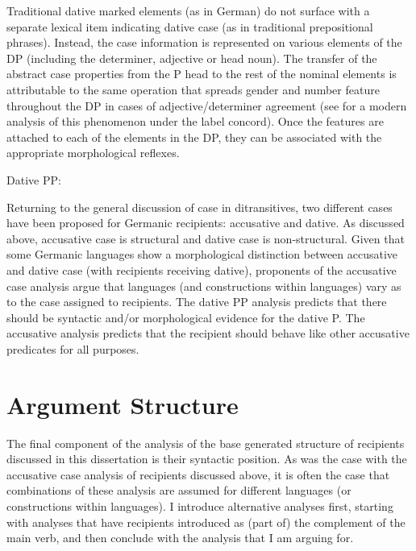 Traditional dative marked elements (as in German) do not surface with a separate lexical item indicating dative case (as in traditional prepositional phrases). Instead, the case information is represented on various elements of the DP (including the determiner, adjective or head noun). The transfer of the abstract case properties from the P head to the rest of the nominal elements is attributable to the same operation that spreads gender and number feature throughout the DP in cases of adjective/determiner agreement (see \citealt{Norris.2012} for a modern analysis of this phenomenon under the label concord). Once the features are attached to each of the elements in the DP, they can be associated with the appropriate morphological reflexes.

\begin{exe}
\ex Dative PP: \\
\end{exe}

Returning to the general discussion of case in ditransitives, two different cases have been proposed for Germanic recipients: accusative and dative. As discussed above, accusative case is structural and dative case is non-structural. Given that some Germanic languages show a morphological distinction between accusative and dative case (with recipients receiving dative), proponents of the accusative case analysis argue that languages (and constructions within languages) vary as to the case assigned to recipients. The dative PP analysis predicts that there should be syntactic and/or morphological evidence for the dative P. The accusative analysis predicts that the recipient should behave like other accusative predicates for all purposes.

\section{Argument Structure}
The final component of the analysis of the base generated structure of recipients discussed in this dissertation is their syntactic position. As was the case with the accusative case analysis of recipients discussed above, it is often the case that combinations of these analysis are assumed for different languages (or constructions within languages). I introduce alternative analyses first, starting with analyses that have recipients introduced as (part of) the complement of the main verb, and then conclude with the analysis that I am arguing for.

